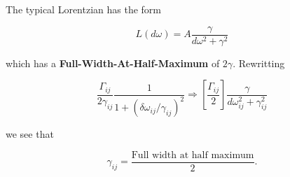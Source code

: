 \begin{framed}\noindent
  The typical Lorentzian has the form

\begin{equation}
  L(d\omega) = A \frac{\gamma}{d\omega^2 + \gamma^2}
\end{equation}

\noindent   which   has  a   \textbf{Full-Width-At-Half-Maximum}   of
$2\gamma$. Rewritting

\begin{equation}
  \frac{\Gamma_{ij}}{2\gamma_{ij}}\frac{1}{1+(\delta\omega_{ij}/\gamma_{ij})^2} \Rightarrow \left[\frac{\Gamma_{ij}}{2}\right] \frac{\gamma}{d\omega_{ij}^2 + \gamma_{ij}^2}
\end{equation}

\noindent we see that

\begin{equation}
  \gamma_{ij} = \frac{\text{Full width at half maximum}}{2}.
\end{equation}

\noindent
\end{framed}

